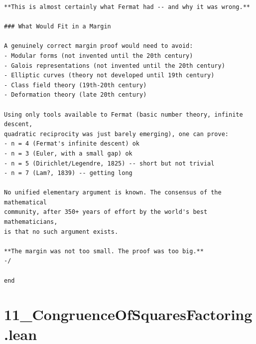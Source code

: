 \documentclass[11pt,twoside,openright]{book}
\theoremstyle{definition}
\theoremstyle{remark}
\begin{document}
\begin{lstlisting}[style=lean]
**This is almost certainly what Fermat had -- and why it was wrong.**

### What Would Fit in a Margin

A genuinely correct margin proof would need to avoid:
- Modular forms (not invented until the 20th century)
- Galois representations (not invented until the 20th century)
- Elliptic curves (theory not developed until 19th century)
- Class field theory (19th-20th century)
- Deformation theory (late 20th century)

Using only tools available to Fermat (basic number theory, infinite descent,
quadratic reciprocity was just barely emerging), one can prove:
- n = 4 (Fermat's infinite descent) ok
- n = 3 (Euler, with a small gap) ok
- n = 5 (Dirichlet/Legendre, 1825) -- short but not trivial
- n = 7 (Lam?, 1839) -- getting long

No unified elementary argument is known. The consensus of the mathematical
community, after 350+ years of effort by the world's best mathematicians,
is that no such argument exists.

**The margin was not too small. The proof was too big.**
-/

end
\end{lstlisting}

\clearpage

\section*{11\_CongruenceOfSquaresFactoring.lean}
\end{document}

